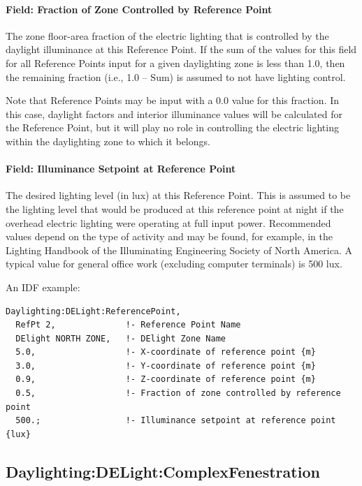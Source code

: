 \paragraph{Field: Fraction of Zone Controlled by Reference Point}\label{field-fraction-of-zone-controlled-by-reference-point}

The zone floor-area fraction of the electric lighting that is controlled by the daylight illuminance at this Reference Point. If the sum of the values for this field for all Reference Points input for a given daylighting zone is less than 1.0, then the remaining fraction (i.e., 1.0 -- Sum) is assumed to not have lighting control.

Note that Reference Points may be input with a 0.0 value for this fraction. In this case, daylight factors and interior illuminance values will be calculated for the Reference Point, but it will play no role in controlling the electric lighting within the daylighting zone to which it belongs.

\paragraph{Field: Illuminance Setpoint at Reference Point}\label{field-illuminance-setpoint-at-reference-point}

The desired lighting level (in lux) at this Reference Point. This is assumed to be the lighting level that would be produced at this reference point at night if the overhead electric lighting were operating at full input power. Recommended values depend on the type of activity and may be found, for example, in the Lighting Handbook of the Illuminating Engineering Society of North America. A typical value for general office work (excluding computer terminals) is 500 lux.

An IDF example:

\begin{lstlisting}
Daylighting:DELight:ReferencePoint,
  RefPt 2,              !- Reference Point Name
  DElight NORTH ZONE,   !- DElight Zone Name
  5.0,                  !- X-coordinate of reference point {m}
  3.0,                  !- Y-coordinate of reference point {m}
  0.9,                  !- Z-coordinate of reference point {m}
  0.5,                  !- Fraction of zone controlled by reference point
  500.;                 !- Illuminance setpoint at reference point {lux}
\end{lstlisting}

\subsection{Daylighting:DELight:ComplexFenestration}\label{daylightingdelightcomplexfenestration}

